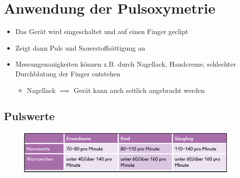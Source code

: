 \chapter{Anwendung der Pulsoxymetrie}
\begin{itemize}
    \item Das Gerät wird eingeschaltet und auf einen Finger geclipt
    \item Zeigt dann Puls und Sauerstoffsättigung an
    \item Messungenauigkeiten können z.B. durch Nagellack, Handcreme, schlechter Durchblutung der Finger entstehen
          \begin{itemize}
              \item Nagellack $\implies$ Gerät kann auch seitlich angebracht werden
          \end{itemize}
\end{itemize}
\section*{Pulswerte}
\begin{figure}[H]
    \centering
    \includegraphics[width=\textwidth]{res/puls.png}
\end{figure}
